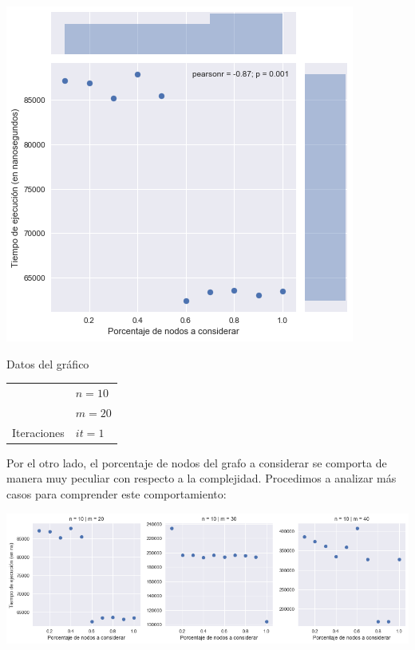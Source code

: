 \noindent
\begin{minipage}{0.55\textwidth}
    \hfill
    \includegraphics[scale=0.6]{img/grasp-p.png}
\end{minipage}
\hfill
\begin{minipage}{0.44\textwidth}
    \begin{center}
        Datos del gráfico

        \begin{tabular}{ | l l |}
            \hline
             & $n = 10$ \\ 
             & $m = 20$ \\ 
            Iteraciones & $it = 1$ \\
            \hline
        \end{tabular}
    \end{center}
\end{minipage}

Por el otro lado, el porcentaje de nodos del grafo a considerar se comporta de manera muy peculiar con respecto a la complejidad. Procedimos a analizar más casos para comprender este comportamiento:

\begin{center}
    \includegraphics[scale=0.6]{img/grasp-p-multi.png}
\end{center}

